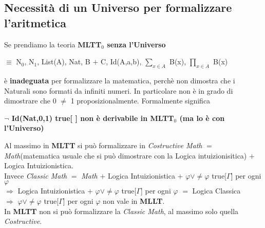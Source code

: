 \subsection{Necessit\`a di un Universo per formalizzare l'aritmetica}
\label{subsec:Necessit\`a-di-un-Universo-per-formalizzare-l'aritmetica}
Se prendiamo la teoria \textbf{MLTT$_0$ senza l'Universo} \begin{center}$\equiv$ N$_0$, N$_1$, List(A), Nat, B $+$ C, Id(A,a,b), $\sum\limits_{x \in A}$ B(x), $\prod\limits_{x \in A}$ B(x)\end{center}
\noindent
\`e \textbf{inadeguata} per formalizzare la matematica, perch\`e non dimostra che i Naturali sono formati da infiniti numeri. In particolare non \`e in grado di dimostrare che 0 $\neq$ 1 proposizionalmente. Formalmente significa
\begin{center}\textbf{$\neg$ Id(Nat,0,1) true[ ] non \`e derivabile in MLTT$_0$ (ma lo \`e con l'Universo)}\end{center}
\noindent
Al massimo in \textbf{MLTT} si pu\`o formalizzare in \textit{Costructive Math} $=$ \textit{Math}(matematica usuale che si pu\`o dimostrare con la Logica intuizionisitica) $+$ Logica Intuizionistica.\\
Invece \textit{Classic Math} $=$ \textit{Math} $+$ Logica Intuizionistica $+$ $\varphi \vee \neq\varphi$ true[$\Gamma$] per ogni $\varphi$\\
$\Rightarrow$ Logica Intuizionistica $+$ $\varphi \vee \neq\varphi$ true[$\Gamma$] per ogni $\varphi$ $=$ Logica Classica\\
$\Rightarrow$ $\varphi \vee \neq\varphi$ true[$\Gamma$] per ogni $\varphi$ non vale in \textbf{MLLT}.\\
In \textbf{MLTT} non si pu\`o formalizzare la \textit{Classic Math}, al massimo solo quella \textit{Costructive}.
